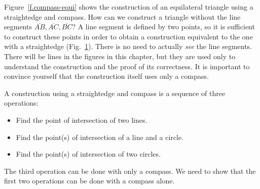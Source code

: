 Figure~\ref{f.compass-equi} shows the construction of an equilateral triangle using a straightedge and compass. How can we construct a triangle without the line segments $\overline{AB}, \overline{AC}, \overline{BC}$? A line segment is defined by two points, so it is sufficient to construct these points in order to obtain a construction equivalent to the one with a straightedge (Fig.~\ref{f.compass-equi-only}). There is no need to actually \emph{see} the line segments.
There will be lines in the figures in this chapter, but they are used only to understand the construction and the proof of its correctness. It is important to convince yourself that the construction itself uses only a compass.
\begin{figure}[ht]
\subfigures
{}
\hfill
{}
\label{f.compass-equi}
\label{f.compass-equi-only}
\end{figure}

A construction using a straightedge and compass is a sequence of three operations:
\begin{itemize}
\item Find the point of intersection of two lines.
\item Find the point(s) of intersection of a line and a circle.
\item Find the point(s) of intersection of two circles.
\end{itemize}
The third operation can be done with only a compass. We need to show that the first two operations can be done with a compass alone.

